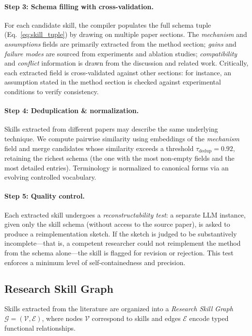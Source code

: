 \paragraph{Step 3: Schema filling with cross-validation.} For each candidate skill, the compiler populates the full schema tuple (Eq.~\ref{eq:skill_tuple}) by drawing on multiple paper sections. The \emph{mechanism} and \emph{assumptions} fields are primarily extracted from the method section; \emph{gains} and \emph{failure modes} are sourced from experiments and ablation studies; \emph{compatibility} and \emph{conflict} information is drawn from the discussion and related work. Critically, each extracted field is cross-validated against other sections: for instance, an assumption stated in the method section is checked against experimental conditions to verify consistency.

\paragraph{Step 4: Deduplication \& normalization.} Skills extracted from different papers may describe the same underlying technique. We compute pairwise similarity using embeddings of the \emph{mechanism} field and merge candidates whose similarity exceeds a threshold $\tau_{\text{dedup}} = 0.92$, retaining the richest schema (the one with the most non-empty fields and the most detailed entries). Terminology is normalized to canonical forms via an evolving controlled vocabulary.

\paragraph{Step 5: Quality control.} Each extracted skill undergoes a \emph{reconstructability test}: a separate LLM instance, given only the skill schema (without access to the source paper), is asked to produce a reimplementation sketch. If the sketch is judged to be substantively incomplete---that is, a competent researcher could not reimplement the method from the schema alone---the skill is flagged for revision or rejection. This test enforces a minimum level of self-containedness and precision.

\subsection{Research Skill Graph}
\label{sec:skill_graph}

Skills extracted from the literature are organized into a \emph{Research Skill Graph} $\mathcal{G} = (\mathcal{V}, \mathcal{E})$, where nodes $\mathcal{V}$ correspond to skills and edges $\mathcal{E}$ encode typed functional relationships.

